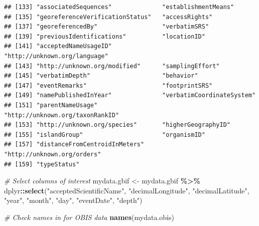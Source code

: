 \documentclass[
]{book}
\newenvironment{Shaded}{\begin{snugshade}}{\end{snugshade}}
\newcommand{\CommentTok}[1]{\textcolor[rgb]{0.56,0.35,0.01}{\textit{#1}}}
\newcommand{\FunctionTok}[1]{\textcolor[rgb]{0.13,0.29,0.53}{\textbf{#1}}}
\newcommand{\NormalTok}[1]{#1}
\newcommand{\OtherTok}[1]{\textcolor[rgb]{0.56,0.35,0.01}{#1}}
\newcommand{\SpecialCharTok}[1]{\textcolor[rgb]{0.81,0.36,0.00}{\textbf{#1}}}
\newcommand{\StringTok}[1]{\textcolor[rgb]{0.31,0.60,0.02}{#1}}
\begin{document}
\begin{verbatim}
## [133] "associatedSequences"              "establishmentMeans"              
## [135] "georeferenceVerificationStatus"   "accessRights"                    
## [137] "georeferencedBy"                  "verbatimSRS"                     
## [139] "previousIdentifications"          "locationID"                      
## [141] "acceptedNameUsageID"              "http://unknown.org/language"     
## [143] "http://unknown.org/modified"      "samplingEffort"                  
## [145] "verbatimDepth"                    "behavior"                        
## [147] "eventRemarks"                     "footprintSRS"                    
## [149] "namePublishedInYear"              "verbatimCoordinateSystem"        
## [151] "parentNameUsage"                  "http://unknown.org/taxonRankID"  
## [153] "http://unknown.org/species"       "higherGeographyID"               
## [155] "islandGroup"                      "organismID"                      
## [157] "distanceFromCentroidInMeters"     "http://unknown.org/orders"       
## [159] "typeStatus"
\end{verbatim}

\begin{Shaded}
\begin{Highlighting}[]
\CommentTok{\# Select columns of interest}
\NormalTok{mydata.gbif }\OtherTok{\textless{}{-}}\NormalTok{ mydata.gbif }\SpecialCharTok{\%\textgreater{}\%}
\NormalTok{    dplyr}\SpecialCharTok{::}\FunctionTok{select}\NormalTok{(}\StringTok{"acceptedScientificName"}\NormalTok{,}
        \StringTok{"decimalLongitude"}\NormalTok{, }\StringTok{"decimalLatitude"}\NormalTok{,}
        \StringTok{"year"}\NormalTok{, }\StringTok{"month"}\NormalTok{, }\StringTok{"day"}\NormalTok{, }\StringTok{"eventDate"}\NormalTok{,}
        \StringTok{"depth"}\NormalTok{)}

\CommentTok{\# Check names in for OBIS data}
\FunctionTok{names}\NormalTok{(mydata.obis)}
\end{Highlighting}
\end{Shaded}
\end{document}
